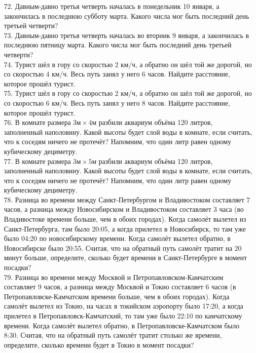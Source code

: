 \documentclass[12pt]{article}
\begin{document}
72. Давным-давно третья четверть началась в понедельник 10 января, а закончилась в последнюю субботу марта. Какого числа мог быть последний день третьей четверти?\\
73. Давным-давно третья четверть началась во вторник 9 января, а закончилась в последнюю пятницу марта. Какого числа мог быть последний день третьей четверти?\\
74. Турист шёл в гору со скоростью 2 км/ч, а обратно он шёл той же дорогой, но со скоростью 4 км/ч. Весь путь занял у него 6 часов. Найдите расстояние, которое прошёл турист.\\
75. Турист шёл в гору со скоростью 2 км/ч, а обратно он шёл той же дорогой, но со скоростью 6 км/ч. Весь путь занял у него 8 часов. Найдите расстояние, которое прошёл турист.\\
76. В комнате размера $3\text{м}\times4\text{м}$ разбили аквариум объёма 120 литров, заполненный наполовину. Какой высоты будет слой воды в комнате, если считать, что к соседям ничего не протечёт? Напомним, что один литр равен одному кубическому дециметру.\\
77. В комнате размера $3\text{м}\times5\text{м}$ разбили аквариум объёма 120 литров, заполненный наполовину. Какой высоты будет слой воды в комнате, если считать, что к соседям ничего не протечёт? Напомним, что один литр равен одному кубическому дециметру.\\
78. Разница во времени между Санкт-Петербургом и Владивостоком составляет 7 часов, а разница между Новосибирском и Владивостоком составляет 3 часа (во Владивостоке времени больше, чем в обоих городах). Когда самолёт вылетел из Санкт-Петербурга, там было 20:05, а когда прилетел в Новосибирск, то там уже было 04:20 по новосибирскому времени. Когда самолёт вылетел обратно, в Новосибирске было 20:55. Считая, что на обратный путь самолёт тратит на 20 минут больше, определите, сколько будет времени в Санкт-Петербурге в момент посадки?\\
79. Разница во времени между Москвой и Петропавловском-Камчатским составляет 9 часов, а разница между Москвой и Токио составляет 6 часов (в Петропавловске-Камчатском времени больше, чем в обоих городах). Когда самолёт вылетел из Токио, на часах в токийском аэропорту было 17:20, а когда прилетел в Петропавловск-Камчатский, то там уже было 22:10 по камчатскому времени. Когда самолёт вылетел обратно, в Петропавловске-Камчатском было 8:30. Считая, что на обратный путь самолёт тратит столько же времени, определите, сколько времени будет в Токио в момент посадки?\\
\end{document}
